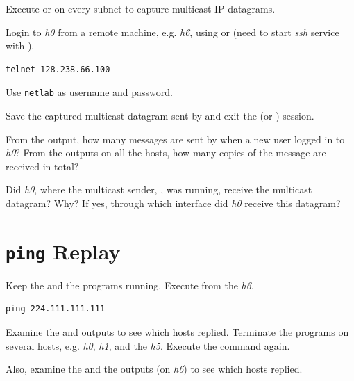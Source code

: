\documentclass{../UTNetLab}
\begin{document}
Execute  or  on every subnet to capture multicast IP datagrams.

Login to \textit{h0} from a remote machine, e.g. \textit{h6}, using  or  (need to start \textit{ssh} service with ).

\begin{lstlisting}
telnet 128.238.66.100
\end{lstlisting}
Use \texttt{netlab} as username and password.

Save the captured multicast datagram sent by  and exit the  (or ) session.

\begin{report}
    \item From the  output, how many messages are sent by  when a new user logged in to \textit{h0}?
    From the  outputs on all the hosts, how many copies of the message are received in total?

    \item Did \textit{h0}, where the multicast sender, , was running, receive the multicast datagram?
    Why?
    If yes, through which interface did \textit{h0} receive this datagram?
\end{report}

\section{\texttt{ping} Replay}
Keep the  and the  programs running.
Execute  from the \textit{h6}.

\begin{lstlisting}
ping 224.111.111.111
\end{lstlisting}
Examine the  and  outputs to see which hosts replied.
Terminate the  programs on several hosts, e.g. \textit{h0}, \textit{h1}, and the \textit{h5}.
Execute the  command again.

Also, examine the  and the  outputs (on \textit{h6}) to see which hosts replied.
\end{document}
